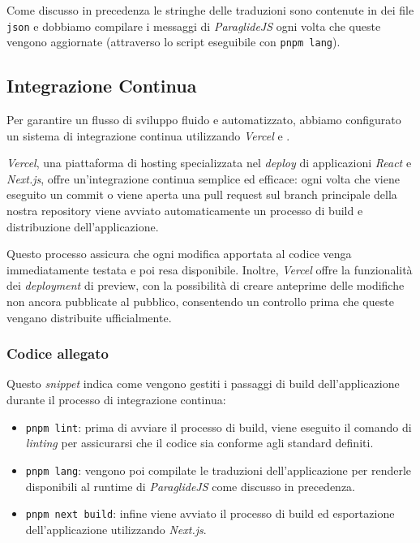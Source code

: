 Come discusso in precedenza le stringhe delle traduzioni sono contenute in dei file \texttt{json} e dobbiamo compilare i messaggi di \textit{ParaglideJS} ogni volta che queste vengono aggiornate (attraverso lo script eseguibile con \texttt{pnpm lang}).

\newpage
\subsection{Integrazione Continua}

Per garantire un flusso di sviluppo fluido e automatizzato, abbiamo configurato un sistema di integrazione continua utilizzando \textit{Vercel} e .

\textit{Vercel}, una piattaforma di hosting specializzata nel \textit{deploy} di applicazioni \textit{React} e \textit{Next.js}, offre un'integrazione continua semplice ed efficace: ogni volta che viene eseguito un commit o viene aperta una pull request sul branch principale della nostra repository viene avviato automaticamente un processo di build e distribuzione dell'applicazione.

Questo processo assicura che ogni modifica apportata al codice venga immediatamente testata e poi resa disponibile. Inoltre, \textit{Vercel} offre la funzionalità dei \textit{deployment} di preview, con la possibilità di creare anteprime delle modifiche non ancora pubblicate al pubblico, consentendo un controllo prima che queste vengano distribuite ufficialmente.

\vspace{-0.4em}
\subsubsection*{Codice allegato}

\vspace{0.3em}

\vspace{0.3em}

Questo \textit{snippet} indica come vengono gestiti i passaggi di build dell'applicazione durante il processo di integrazione continua:

\vspace{-0.4em}
\begin{itemize}
\setlength{\itemsep}{-0.1em}
    \item \texttt{pnpm lint}: prima di avviare il processo di build, viene eseguito il comando di \textit{linting} per assicurarsi che il codice sia conforme agli standard definiti.
    \item \texttt{pnpm lang}: vengono poi compilate le traduzioni dell'applicazione per renderle disponibili al runtime di \textit{ParaglideJS} come discusso in precedenza.
    \item \texttt{pnpm next build}: infine viene avviato il processo di build ed esportazione dell'applicazione utilizzando \textit{Next.js}.
\end{itemize}